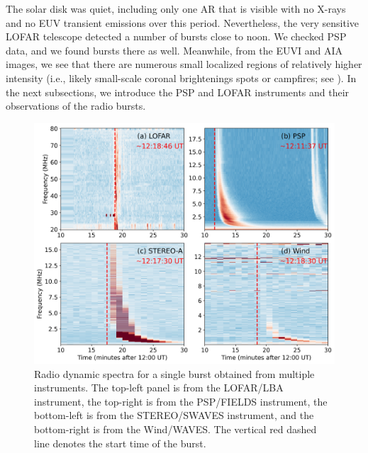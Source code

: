 The solar disk was quiet, including only one AR that is visible with no X-rays and no EUV transient emissions over this period.
Nevertheless, the very sensitive LOFAR telescope detected a number of bursts close to noon. We checked PSP data, and we found bursts there as well.
Meanwhile, from the EUVI and AIA images, we see that there are numerous small localized regions of relatively higher intensity (i.e., likely small-scale coronal brightenings spots or campfires; see \citet{young18, madjarska19, berghmans21}).
In the next subsections, we introduce the PSP and LOFAR instruments and their observations of the radio bursts.
\begin{figure}
\centering
\includegraphics[width=0.9\hsize]{figs/ch2/all_dyspec.png}
\caption{Radio dynamic spectra for a single burst obtained from multiple instruments. The top-left panel is from the LOFAR/LBA instrument, the top-right is from the PSP/FIELDS instrument, the bottom-left is from the STEREO/SWAVES instrument, and the bottom-right is from the Wind/WAVES. The vertical red dashed line denotes the start time of the burst.}
\label{fig_alldyspec}
\end{figure}

